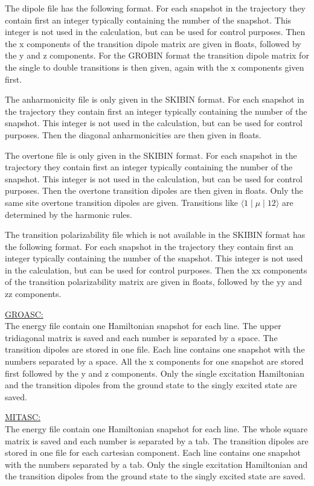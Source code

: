 The dipole file has the following format.
For each snapshot in the trajectory they contain first an integer typically containing the number of the snapshot. This integer is not used in the calculation, but can be used for control purposes.
Then the x components of the transition dipole matrix are given in floats, followed by the y and z components. For the GROBIN format the transition dipole matrix for the single to double transitions is then given, again with the x components given first.

The anharmonicity file is only given in the SKIBIN format.
For each snapshot in the trajectory they contain first an integer typically containing the number of the snapshot. This integer is not used in the calculation, but can be used for control purposes.
Then the diagonal anharmonicities are then given in floats.

The overtone file is only given in the SKIBIN format.
For each snapshot in the trajectory they contain first an integer typically containing the number of the snapshot. This integer is not used in the calculation, but can be used for control purposes.
Then the overtone transition dipoles are then given in floats. Only the same site overtone transition dipoles are given. Transitions like $\langle 1\mid\mu\mid 12\rangle$ are determined by the harmonic rules.

The transition polarizability file which is not available in the SKIBIN format 
has the following format. For each snapshot in the trajectory they contain first an integer 
typically containing the number of the snapshot. This integer is not used in the calculation, 
but can be used for control purposes. Then the xx components of the transition polarizability
matrix are given in floats, followed by the yy and zz components. 

\noindent
\underline{GROASC:}\\
The energy file contain one Hamiltonian snapshot for each line. The upper tridiagonal matrix is saved and each number is separated by a space. The transition dipoles are stored in one file. Each line contains one snapshot with the numbers separated by a space. All the x components for one snapshot are stored first followed by the y and z components. Only the single excitation Hamiltonian and the transition dipoles from the ground state to the singly excited state are saved.

\noindent
\underline{MITASC:}\\
The energy file contain one Hamiltonian snapshot for each line. The whole square matrix is saved and each number is separated by a tab. The transition dipoles are stored in one file for each cartesian component. Each line contains one snapshot with the numbers separated by a tab. Only the single excitation Hamiltonian and the transition dipoles from the ground state to the singly excited state are saved.


